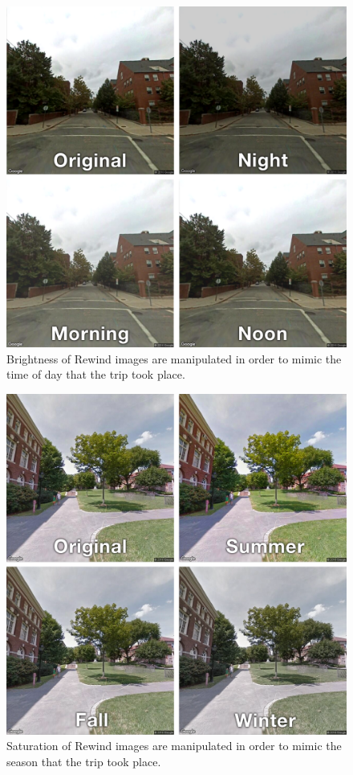 \documentclass{sigchi}
\begin{document}
\begin{figure}
   \centering
     \includegraphics[width=1\linewidth]{Rewind-time_of_day}
     \caption{Brightness of Rewind images are manipulated in order to mimic the time of day that the trip took place.}
     \label{fig:timeofday}
\end{figure}

\begin{figure}
   \centering
     \includegraphics[width=1\linewidth]{Rewind-seasons}
     \caption{Saturation of Rewind images are manipulated in order to mimic the season that the trip took place.}
     \label{fig:season}
\end{figure}
\end{document}
